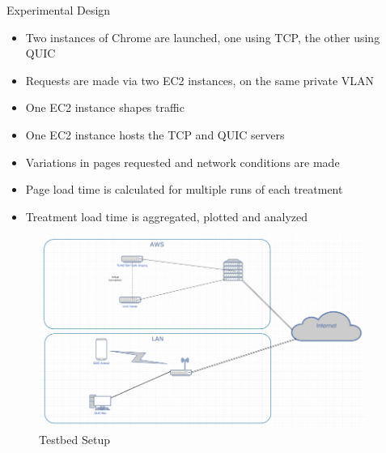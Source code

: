 \documentclass[final]{beamer}
\newlength{\onecolwid}
\begin{document}
\begin{frame}[t]
\begin{columns}[t]
\begin{column}{\onecolwid}
\begin{block}{Experimental Design}

\begin{itemize}
	\item Two instances of Chrome are launched, one using TCP, the other using QUIC
	\item Requests are made via two EC2 instances, on the same private VLAN
	\item One EC2 instance shapes traffic
	\item One EC2 instance hosts the TCP and QUIC servers
	\item Variations in pages requested and network conditions are made
	\item Page load time is calculated for multiple runs of each treatment
	\item Treatment load time is aggregated, plotted and analyzed
\end{itemize}

\begin{figure}
\includegraphics[width=0.8\linewidth]{images/Network_diagram.png}
\caption{Testbed Setup}
\end{figure}

\end{block}

\end{column} %


\begin{column}{\onecolwid}%



\end{column}
\end{columns}
\end{frame}
\end{document}

